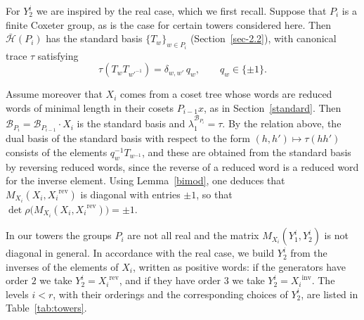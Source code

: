 \documentclass[11pt, reqno]{amsart}
\newcommand{\cB}{\mathcal{B}}
\newcommand{\cH}{\mathcal{H}}
\newcommand{\wrev}[1]{{#1}^{\mathrm{rev}}}
\newcommand{\winv}[1]{{#1}^{\mathrm{inv}}}
\numberwithin{equation}{section}
\theoremstyle{remark}
\begin{document}
For $Y^i_2$ we are inspired by the real case, which we first recall. Suppose that $P_i$ is a finite Coxeter group, as is the case for certain towers considered here. Then $\bar{\cH}(P_i)$ has the standard basis $\{T_w\}_{w\in P_i}$ (Section~\ref{sec-2.2}), with canonical trace $\tau$ satisfying
\[
\tau(T_wT_{w'^{-1}})=\delta_{w,w'}\,q_w, \qquad q_w\in \{\pm1\}.
\]

Assume moreover that $X_i$ comes from a coset tree whose words are reduced words of minimal length in their cosets $P_{i-1}x$, as in Section~\ref{standard}. Then $\cB_{P_i}=\cB_{P_{i-1}}\cdot X_i$ is the standard basis and $\lambda_1^{\cB_{P_i}}=\tau$. By the relation above, the dual basis of the standard basis with respect to the form $(h,h')\mapsto\tau(hh')$ consists of the elements $q_w^{-1}T_{w^{-1}}$, and these are obtained from the standard basis by reversing reduced words, since the reverse of a reduced word is a reduced word for the inverse element. Using Lemma~\ref{bimod}, one deduces that $M_{X_i}(X_i,\wrev{X_i})$ is diagonal with entries $\pm1$, so that $\det\rho\bigl(M_{X_i}(X_i,\wrev{X_i})\bigr)=\pm1$.

In our towers the groups $P_i$ are not all real and the matrix $M_{X_i}(Y^i_1,Y^i_2)$ is not diagonal in general. In accordance with the real case, we build $Y^i_2$ from the inverses of the elements of $X_i$, written as positive words: if the generators have order $2$ we take $Y^i_2=\wrev{X_i}$, and if they have order $3$ we take $Y^i_2=\winv{X_i}$. The levels $i<r$, with their orderings and the corresponding choices of $Y^i_2$, are listed in Table~\ref{tab:towers}.
\end{document}
